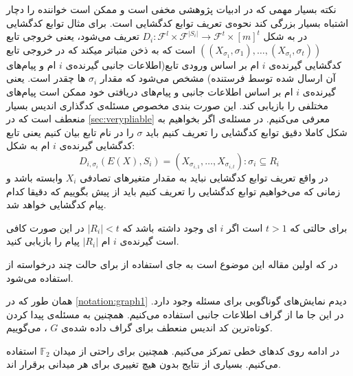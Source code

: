 \begin{remark}
	\label{remark:pliablevsvery}
	نکته بسیار مهمی که در ادبیات پژوهشی 
	\picod
	مخفی است و ممکن است خواننده را دچار اشتباه بسیار بزرگی کند نحوه‌ی تعریف توابع کدگشایی است. برای مثال توابع کدگشایی در
	\cite{song2017polynomialtime}
	به شکل
	$D_i: \mathcal{F}^l \times \mathcal{F}^{|S_i|} \rightarrow \mathcal{F}^t \times [m]^t$
	تعریف می‌شود، یعنی خروجی تابع
	$((X_{\sigma_1}, \sigma_1), \ldots, (X_{\sigma_t}, \sigma_t) )$
	است که به ذخن متباتر میکند که در خروجی تابع کدگشایی گیرنده‌ی 
	$i$
	ام بر اساس ورودی تابع(اطلاعات جانبی گیرنده‌ی 
	$i$
	ام و پیام‌های آن ارسال شده توسط فرستنده) مشخص می‌شود که مقدار
	$\sigma_i$
	ها چقدر است. یعنی گیرنده‌ی
	$i$
	ام بر اساس اطلاعات جانبی و پیام‌های دریافتی خود ممکن است پیام‌های مختلفی را بازیابی کند. این صورت بندی مخصوص مسئله‌ی کدگذاری اندیس بسیار منعطف است که در
	\autoref{sec:verypliable}
	معرفی می‌کنیم. در مسئله‌ی
	\picod
	اگر بخواهیم به شکل کاملا دقیق توابع کدگشایی را تعریف کنیم باید 
	$\sigma$
	 را در نام تابع بیان کنیم یعنی تابع کدگشایی گیرنده‌ی
	 $i$
	 ام به شکل:
	 	$$D_{i, \sigma_i}(E(X), S_i) = (X_{\sigma_{i,1}}, \ldots, X_{\sigma_{i,t}}): \sigma_i \subseteq R_i $$
	 	در واقع تعریف توابع کدگشایی نباید به مقدار متغیرهای تصادفی
	 	$X_i$
	 	وابسته باشد و زمانی که می‌خواهیم توابع کدگشایی را تعریف کنیم باید از پیش بگوییم که دقیقا کدام پیام کدگشایی خواهد شد.
\end{remark}

\begin{note}
	برای حالتی که
	$t > 1$
	است اگر
	$i$
	ای وجود داشته باشد که
	$|R_i| < t$
	در این صورت کافی است گیرنده‌ی 
	$i$
	ام
	$|R_i|$
	پیام را بازیابی کنید.
	\cite{pliablefirstpaper}
\end{note}

\begin{note}
	در 
	\cite{pliablefirstpaper}
	که اولین مقاله این موضوع است به جای استفاده از
	\picodt
	برای حالت چند درخواسته از
	استفاده می‌شود.
\end{note}
\begin{notation}
	همان طور که در
	\autoref{notation:graph1}
	دیدم نمایش‌های گوناگوبی برای مسئله وجود دارد. در این جا ما از گراف اطلاعات جانبی استفاده می‌کنیم. همچنین به مسئله‌ی پیدا کردن کوتاه‌ترین کد اندیس منعطف برای گراف داده شده‌ی 
	$G$
	،
	\picodg
	می‌گوییم.
\end{notation}


در ادامه  روی کدهای خطی تمرکز می‌کنیم. همچنین برای راحتی از میدان
$\mathbb{F}_2$
استفاده می‌کنیم. بسیاری از نتایج بدون هیچ تغییری برای هر میدانی برقرار اند.

